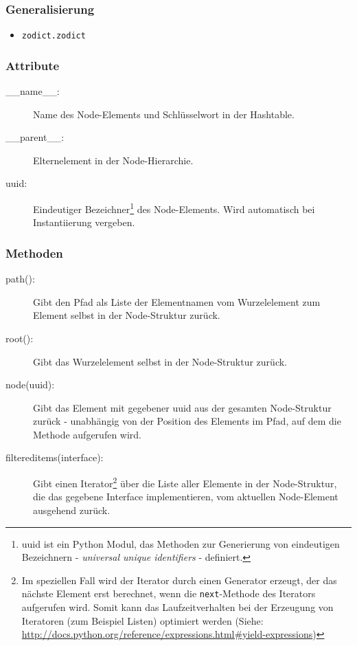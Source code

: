 \subsubsection{Generalisierung}
\begin{itemize}
\item \texttt{zodict.zodict}
\end{itemize}

\subsubsection{Attribute}
\begin{description}
\item[\_\_name\_\_:] Name des Node-Elements und Schlüsselwort in der Hashtable.
\item[\_\_parent\_\_:] Elternelement in der Node-Hierarchie.
\item[uuid:] Eindeutiger Bezeichner\footnote{uuid ist ein Python Modul, das Methoden zur Generierung von eindeutigen Bezeichnern - \emph{universal unique identifiers} - definiert.}
des Node-Elements. Wird automatisch bei Instantiierung vergeben.
\end{description}

\subsubsection{Methoden}
\begin{description}
\item[path():] Gibt den Pfad als Liste der Elementnamen vom Wurzelelement zum Element selbst in der Node-Struktur zurück.
\item[root():] Gibt das Wurzelelement selbst in der Node-Struktur zurück.
\item[node(uuid):] Gibt das Element mit gegebener uuid aus der gesamten Node-Struktur zurück - unabhängig von der Position des Elements im Pfad, auf dem die Methode aufgerufen wird.
\item[filtereditems(interface):] Gibt einen Iterator\footnote{Im speziellen Fall wird der Iterator durch einen Generator erzeugt, der das nächste Element erst berechnet, wenn die \texttt{next}-Methode des Iterators aufgerufen wird. Somit kann das Laufzeitverhalten bei der Erzeugung von Iteratoren (zum Beispiel Listen) optimiert werden (Siehe: \url{http://docs.python.org/reference/expressions.html\#yield-expressions})}
über die Liste aller Elemente in der Node-Struktur, die das gegebene Interface implementieren, vom aktuellen Node-Element ausgehend zurück.
\end{description}

